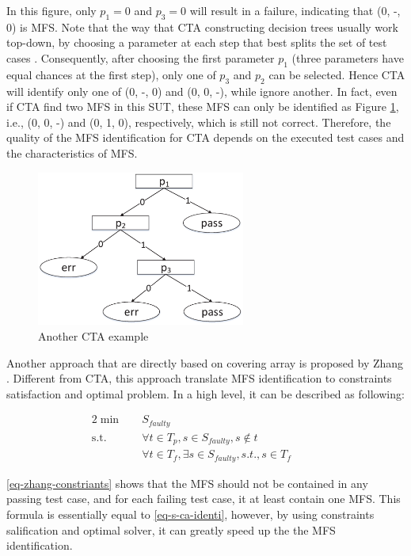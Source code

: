 \documentclass[10pt,journal,cspaper,compsoc]{IEEEtran}
\begin{document}
In this figure, only $p_{1} = 0$ and $p_{3} = 0$ will result in a failure, indicating that (0, -, 0) is MFS. Note that the way that CTA constructing decision trees usually work top-down, by choosing a parameter at each step that best splits the set of test cases \cite{rokach2005top}. Consequently, after choosing the first parameter $p_{1}$ (three parameters have equal chances at the first step), only one of $p_{3}$ and $p_{2}$ can be selected. Hence CTA will identify only one of (0, -, 0) and (0, 0, -), while ignore another.  In fact, even if CTA find two MFS in this SUT, these MFS can only be identified as Figure \ref{figcta2}, i.e., (0, 0, -) and (0, 1, 0), respectively,  which is still not correct. Therefore, the quality of the MFS identification for CTA depends on the executed test cases and the characteristics of MFS.

\begin{figure}
 \centering
 \includegraphics[width=2.7in]{cta-example2.eps}
 \caption{Another CTA example}
 \label{figcta2}
\end{figure}


Another approach that are directly based on covering array is proposed by Zhang \cite{zhang2012faulty}. Different from CTA, this approach translate MFS identification to constraints satisfaction and optimal problem. In a high level, it can be described as following:

\begin{alignat}{2}
\min\quad &  S_{faulty} &{}& \tag{EQ4} \label{eq-zhang-constriants}\\
\mbox{s.t.}\quad
& \forall t \in T_{p}, s \in S_{faulty}, s \not\in t &\quad& {}\nonumber \\
& \forall t \in T_{f}, \exists s \in S_{faulty}, s.t., s \in T_{f} &\quad& {}\nonumber
\end{alignat}

\ref{eq-zhang-constriants} shows that the MFS should not be contained in any passing test case, and for each failing test case, it at least contain one MFS. This formula is essentially equal to \ref{eq-s-ca-identi}, however, by using constraints salification and optimal solver, it can greatly speed up the the MFS identification.
\end{document}
